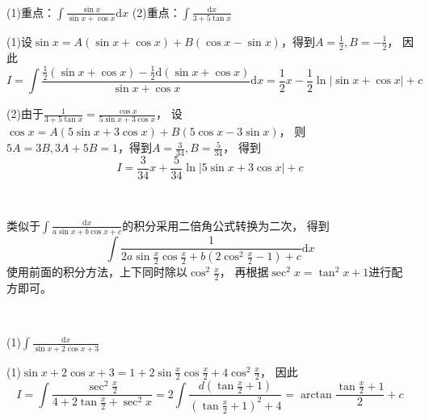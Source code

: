 ~

\begin{exercise}
  (1)重点：$\int \frac{\sin x}{\sin x + \cos x}\mathrm{d} x$
  (2)重点：$\int \frac{\mathrm{d} x}{3 + 5\tan x}$
\end{exercise}

\begin{solution}
  (1)设$\sin x = A(\sin x + \cos x )+ B(\cos x - \sin x)$，得到$A = \frac{1}{2}, B = - \frac{1}{2}$，
  因此
  \begin{equation*}
    I = \int \frac{\frac{1}{2}(\sin x + \cos x) - \frac{1}{2} \mathrm{d}(\sin x + \cos x)}{\sin x + \cos x}\mathrm{d} x = \frac{1}{2}x - \frac{1}{2}\ln \left| \sin x + \cos x \right| + c
  \end{equation*}

  (2)由于$\frac{1}{3 + 5\tan x} = \frac{\cos x}{5 \sin x + 3 \cos x}$，
  设$\cos x = A(5 \sin x + 3 \cos x) + B(5 \cos x - 3 \sin x)$，
  则$5A = 3B, 3A + 5B = 1$，得到$A = \frac{3}{34}, B = \frac{5}{34}$，
  得到
  \begin{equation*}
    I = \frac{3}{34} x + \frac{5}{34} \ln \left| 5 \sin x + 3 \cos x \right| + c
  \end{equation*}
\end{solution}

~

\begin{theorem}
  类似于$\int \frac{\mathrm{d} x}{a \sin x + b \cos x + c}$的积分采用二倍角公式转换为二次，
  得到
  \begin{equation*}
    \int \frac{1}{2a \sin \frac{x}{2} \cos \frac{x}{2} + b(2 \cos^2 \frac{x}{2} - 1) + c} \mathrm{d} x
  \end{equation*}
  使用前面的积分方法，上下同时除以$\cos^2 \frac{x}{2}$，
  再根据$\sec^2 x = \tan^2 x + 1$进行配方即可。
\end{theorem}


~

\begin{exercise}[相关训练]
  (1)$\int \frac{\mathrm{d} x}{\sin x + 2 \cos x + 3}$
\end{exercise}

\begin{solution}
  (1)$\sin x + 2 \cos x + 3 = 1 + 2 \sin \frac{x}{2} \cos \frac{x}{2} + 4 \cos^2 \frac{x}{2}$，
  因此
  \begin{equation*}
    I = \int \frac{\sec^2 \frac{x}{2}}{4 + 2 \tan \frac{x}{2} + \sec^2 x} = 2 \int \frac{d(\tan \frac{x}{2} + 1)}{(\tan \frac{x}{2} + 1)^2 + 4} = \arctan \frac{\tan \frac{x}{2} + 1}{2} + c
  \end{equation*}
\end{solution}

